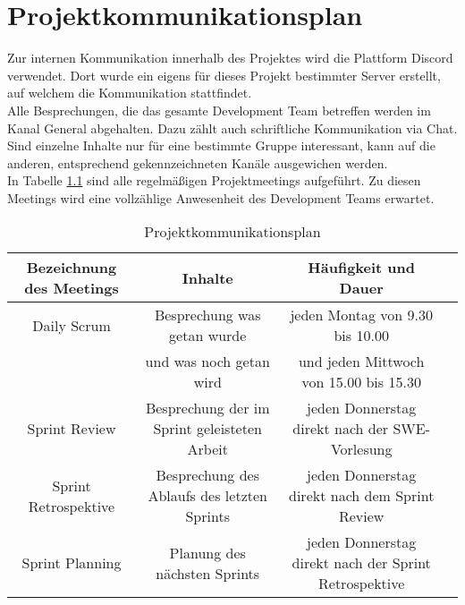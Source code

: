\chapter{Projektkommunikationsplan}
Zur internen Kommunikation innerhalb des Projektes wird die Plattform Discord verwendet. Dort wurde ein eigens für dieses Projekt bestimmter Server erstellt, auf welchem die Kommunikation stattfindet. \\
Alle Besprechungen, die das gesamte Development Team betreffen werden im Kanal \glqq General\grqq\: abgehalten. Dazu zählt auch schriftliche Kommunikation via Chat. \\
Sind einzelne Inhalte nur für eine bestimmte Gruppe interessant, kann auf die anderen, entsprechend gekennzeichneten Kanäle ausgewichen werden. \\
In Tabelle \ref{tab:Kommunikation} sind alle regelmäßigen Projektmeetings aufgeführt. Zu diesen Meetings wird eine vollzählige Anwesenheit des Development Teams erwartet.

\begin{table}[h]
\centering
\tiny
\begin{tabular} [h] {|c|c|c|c|}
\hline
Bezeichnung des Meetings & Inhalte & Häufigkeit und Dauer \\
\hline
Daily Scrum & Besprechung was getan wurde & jeden Montag von 9.30 bis 10.00\\
\quad & und was noch getan wird & und jeden Mittwoch von 15.00 bis 15.30 \\
\hline
Sprint Review & Besprechung der im Sprint geleisteten Arbeit & jeden Donnerstag direkt nach der SWE-Vorlesung\\
\hline
Sprint Retrospektive & Besprechung des Ablaufs des letzten Sprints & jeden Donnerstag direkt nach dem Sprint Review\\
\hline
Sprint Planning & Planung des nächsten Sprints & jeden Donnerstag direkt nach der Sprint Retrospektive\\
\hline
\end{tabular}
\caption{Projektkommunikationsplan}
\label{tab:Kommunikation}
\end{table}
